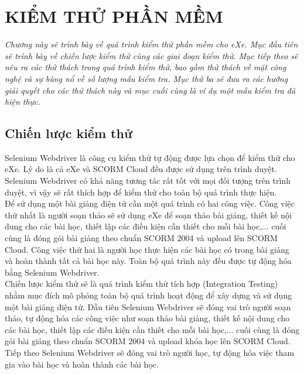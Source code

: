 \chapter{KIỂM THỬ PHẦN MỀM}
\begin{flushleft}
	\fontsize{12pt}{7pt}\selectfont
	\textit{Chương này sẽ trình bày về quá trình kiểm thử phần mềm cho eXe. Mục đầu tiên sẽ trình bày về chiến lược kiểm thử cùng các giai đoạn kiểm thử. Mục tiếp theo sẽ nêu ra các thử thách trong quá trình kiểm thử, bao gồm thử thách về mặt công nghệ và sự bùng nổ về số lượng mẫu kiểm tra. Mục thứ ba sẽ đưa ra các hướng giải quyết cho các thử thách này và mục cuối cùng là ví dụ một mẫu kiểm tra đã hiện thực.}
\end{flushleft}

\section{Chiến lược kiểm thử}

Selenium Webdriver là công cụ kiểm thử tự động được lựa chọn để kiểm thử cho eXe. Lý do là cả eXe và SCORM Cloud đều được sử dụng trên trình duyệt. Selenium Webdriver có khả năng tương tác rất tốt với mọi đối tượng trên trình duyệt, vì vậy sẽ rất thích hợp để kiểm thử cho toàn bộ quá trình thực hiện.\\

Để sử dụng một bài giảng điện tử cần một quá trình có hai công việc. Công việc thứ nhất là người soạn thảo sẽ sử dụng eXe để soạn thảo bài giảng, thiết kế nội dung cho các bài học, thiết lập các điều kiện cần thiết cho mỗi bài học,... cuối cùng là đóng gói bài giảng theo chuẩn SCORM 2004 và upload lên SCORM Cloud. Công việc thứ hai là người học thực hiện các bài học có trong bài giảng và hoàn thành tất cả bài học này. Toàn bộ quá trình này đều được tự động hóa bằng Selenium Webdriver.\\

Chiến lược kiểm thử sẽ là quá trình kiểm thử tích hợp (Integration Testing) nhằm mục đích mô phỏng toàn bộ quá trình hoạt động để xây dựng và sử dụng một bài giảng điện tử. Đầu tiên Selenium Webdriver sẽ đóng vai trò người soạn thảo, tự động hóa các công việc như soạn thảo bài giảng, thiết kế nội dung cho các bài học, thiết lập các điều kiện cần thiết cho mỗi bài học,... cuối cùng là đóng gói bài giảng theo chuẩn SCORM 2004 và upload khóa học lên SCORM Cloud. Tiếp theo Selenium Webdriver sẽ đóng vai trò người học, tự động hóa việc tham gia vào bài học và hoàn thành các bài học.\\

